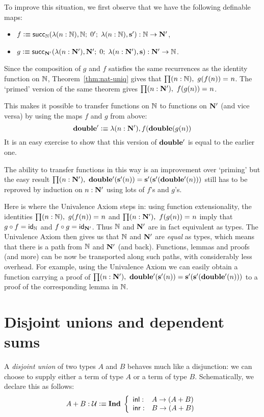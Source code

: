 To improve this situation, we first observe that we have the following definable maps:
\begin{itemize}
\item $f \defeq \rec_\nat(\lambda(n :\nat), \nat; \; \zp; \;  \lambda(n: \nat), \Sp)
       : \nat \to\natp$,
\item $g \defeq \rec_\natp(\lambda(n :\natp), \natp; \; \z; \;  \lambda(n: \natp), \s)
       : \natp \to\nat$.
\end{itemize}
Since the composition of $g$ and $f$ satisfies the same recurrences as the identity function on $\nat$, Theorem~\ref{thm:nat-uniq} gives that $\prd{n : \nat} \id{g(f(n))}{n}$. The `primed' version of the same theorem gives $\prd{n : \natp} \id{f(g(n))}{n}$.

This makes it possible to transfer functions on $\nat$ to functions on $\natp$ (and vice versa) by using the maps $f$ and $g$ from above:
\[ \dblp \defeq \lambda(n :\natp), f(\dbl(g(n)) \]
It is an easy exercise to show that this version of $\dblp$ is equal to the earlier one.

The ability to transfer functions in this way is an improvement over `priming' but the easy result
$\prd{n : \natp} \dblp(\Sp(n))=\Sp(\Sp(\dblp(n)))$ still has to be reproved
by induction on $n:\natp$ using lots of $f$'s and $g$'s.

Here is where the Univalence Axiom steps in: using function extensionality, the identities $\prd{n : \nat} \id{g(f(n))}{n}$
and $\prd{n : \natp} \id{f(g(n))}{n}$ imply that $g\circ{}f = \idfunc[\nat]$ and $f\circ{}g = \idfunc[\natp]$. Thus
$\nat$ and $\natp$ are in fact equivalent as types.
The Univalence Axiom then gives us that $\nat$ and $\natp$ are
\emph{equal} as types, which means that there is
a path from $\nat$ and $\natp$ (and back). Functions, lemmas and proofs (and more)
can be now be transported along such paths, with considerably less overhead. For example, using the
Univalence Axiom we can easily obtain a function carrying a proof of
$\prd{n : \natp} \dblp(\Sp(n))=\Sp(\Sp(\dblp(n)))$ to a proof of the corresponding lemma in $\nat$.


\section{Disjoint unions and dependent sums}
A \emph{disjoint union} of two types $A$ and $B$ behaves much like a disjunction: we can choose to supply either a term of type $A$ or a term of type $B$. Schematically, we declare this as follows:
\[ \disj{A}{B} : \type \defeq \ind \left\{
\begin{array}{ll}
\inl : & A \to (\disj{A}{B}) \\
\inr : & B \to (\disj{A}{B})
\end{array}
\right. \]

